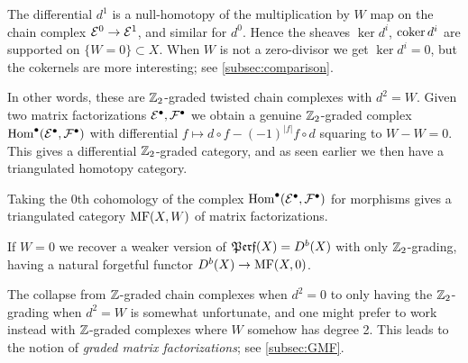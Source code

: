 \begin{remark}{}{}
    The differential $d^1$ is a null-homotopy of the multiplication by $W$ map
    on the chain complex $\mathcal{E}^0\to\mathcal{E}^1$, and similar for $d^0$. Hence the
    sheaves $\ker d^i$, $\operatorname{coker} d^i$ are supported on $\{W=0\}\subset X$. When
    $W$ is not a zero-divisor we get $\ker d^i=0$, but the cokernels are more
    interesting; see \ref{subsec:comparison}.
\end{remark}

In other words, these are $\mathbb{Z}_2$-graded twisted chain complexes with $d^2=W$.
Given two matrix factorizations $\mathcal{E}^\bullet,\mathcal{F}^\bullet$ we obtain a
genuine $\mathbb{Z}_2$-graded complex $\operatorname{Hom}^\bullet(\mathcal{E}^\bullet,\mathcal{F}^\bullet)$ with
differential $f\mapsto d\circ f-(-1)^{|f|}f\circ d$ squaring to $W-W=0$. This
gives a differential $\mathbb{Z}_2$-graded category, and as seen earlier we then have a
triangulated homotopy category.

\begin{definition}{}{}
    Taking the 0th cohomology of the complex
    $\operatorname{Hom}^\bullet(\mathcal{E}^\bullet,\mathcal{F}^\bullet)$ for morphisms gives a
    triangulated category $\mathrm{MF}(X,W)$ of matrix factorizations.
\end{definition}

\begin{remark}{}{}
    If $W=0$ we recover a weaker version of $\operatorname{\mathfrak{Perf}}(X)=D^b(X)$ with only
    $\mathbb{Z}_2$-grading, having a natural forgetful functor $D^b(X)\to\mathrm{MF}(X,0)$.
\end{remark}

The collapse from $\mathbb{Z}$-graded chain complexes when $d^2=0$ to only having the
$\mathbb{Z}_2$-grading when $d^2=W$ is somewhat unfortunate, and one might prefer to
work instead with $\mathbb{Z}$-graded complexes where $W$ somehow has degree 2. This
leads to the notion of \emph{graded matrix factorizations}; see
\ref{subsec:GMF}.

